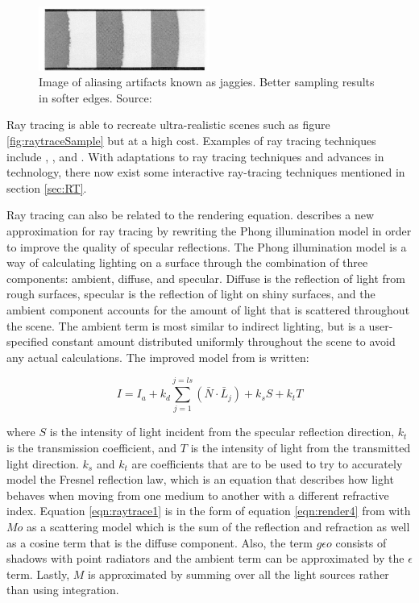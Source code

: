 \begin{figure}[h!]
  \centering
    \includegraphics[width=0.5\textwidth]{jaggies.jpg}
  \caption{Image of aliasing artifacts known as jaggies. Better sampling results in softer edges. Source: \protect\cite{Reeves1987}}
	\label{fig:jaggies}
\end{figure}

Ray tracing is able to recreate ultra-realistic scenes such as figure \ref{fig:raytraceSample} but at a high cost.  Examples of ray tracing techniques include \cite{Whitted1980}, \cite{Cook1986}, and \cite{Ward1988}.  With adaptations to ray tracing techniques and advances in technology, there now exist some interactive ray-tracing techniques mentioned in section \ref{sec:RT}.

Ray tracing can also be related to the rendering equation.  \cite{Whitted1980} describes a new approximation for ray tracing by rewriting the Phong illumination model in order to improve the quality of specular reflections.  The Phong illumination model is a way of calculating lighting on a surface through the combination of three components: ambient, diffuse, and specular.  Diffuse is the reflection of light from rough surfaces, specular is the reflection of light on shiny surfaces, and the ambient component accounts for the amount of light that is scattered throughout the scene.  The ambient term is most similar to indirect lighting, but is a user-specified constant amount distributed uniformly throughout the scene to avoid any actual calculations.  The improved model from \cite{Whitted1980} is written:

\begin{equation}
I = I_{a} + k_{d}\sum_{j=1}^{j=ls}(\bar{N}\cdot\bar{L}_{j})+k_{s}S + k_{t}T \label{eqn:raytrace1}
\end{equation}

where $S$ is the intensity of light incident from the specular reflection direction, $k_{t}$ is the transmission coefficient, and $T$ is the intensity of light from the transmitted light direction. $k_{s}$ and $k_{t}$ are coefficients that are to be used to try to accurately model the Fresnel reflection law, which is an equation that describes how light behaves when moving from one medium to another with a different refractive index.  Equation \ref{eqn:raytrace1} is in the form of equation \ref{eqn:render4} from \cite{Kajiya1986} with $Mo$ as a scattering model which is the sum of the reflection and refraction as well as a cosine term that is the diffuse component. Also, the term $g\epsilon o$ consists of shadows with point radiators and the ambient term can be approximated by the $\epsilon$ term.  Lastly, $M$ is approximated by summing over all the light sources rather than using integration.

